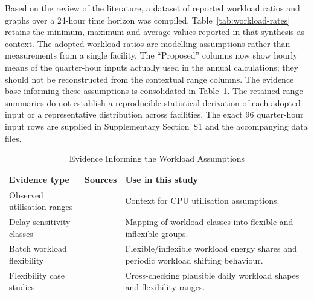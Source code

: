 \documentclass[lettersize,journal]{IEEEtran}
\newcommand{\rev}[1]{#1}
\begin{document}
Based on the review of the literature, a dataset of reported workload ratios and graphs over a 24-hour time horizon was compiled. Table~\ref{tab:workload-rates} retains the minimum, maximum and average values reported in that synthesis as context. The adopted workload ratios are modelling assumptions rather than measurements from a single facility. The ``Proposed'' columns now show hourly means of the quarter-hour inputs actually used in the annual calculations; they should not be reconstructed from the contextual range columns. \rev{The evidence base informing these assumptions is consolidated in Table~\ref{tab:workload-source-summary}. The retained range summaries do not establish a reproducible statistical derivation of each adopted input or a representative distribution across facilities. The exact 96 quarter-hour input rows are supplied in Supplementary Section~S1 and the accompanying data files.}

\begin{table}[!t]
\centering
\caption{\rev{Evidence Informing the Workload Assumptions}}
\label{tab:workload-source-summary}
\begin{scriptsize}
\rev{%
\begin{tabular}{p{}p{}p{0.36\columnwidth}}
\toprule
\textbf{Evidence type} & \textbf{Sources} & \textbf{Use in this study} \\
\midrule
Observed utilisation ranges & \cite{Zaloumis2022IBM,Ghia2011McKinsey} & Context for CPU utilisation assumptions. \\
Delay-sensitivity classes & \cite{6779441} & Mapping of workload classes into flexible and inflexible groups. \\
Batch workload flexibility & \cite{Cao2022ApEn} & Flexible/inflexible workload energy shares and periodic workload shifting behaviour. \\
Flexibility case studies & \cite{Misaghian2023TIA,Xu2023SPIE,Zhou2024IJEPES,Fu2020ApEn,Liu2012PER} & Cross-checking plausible daily workload shapes and flexibility ranges. \\
\bottomrule
\end{tabular}}%
\end{scriptsize}
\end{table}
\end{document}
